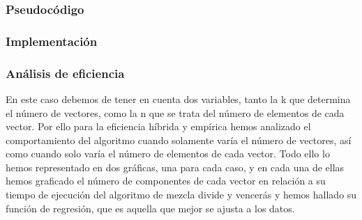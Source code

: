 \begin{figure}
\end{figure}

\subsubsection{Pseudocódigo}



\subsubsection{Implementación}



\subsubsection{Análisis de eficiencia}


En este caso debemos de tener en cuenta dos variables, tanto la k que determina el número de vectores, como la n que se trata del número de elementos de cada vector.
Por ello para la eficiencia híbrida y empírica hemos analizado el comportamiento del algoritmo cuando solamente varía el número de vectores, así como cuando solo varía el número de 
elementos de cada vector. 
Todo ello lo hemos representado en dos gráficas, una para cada caso, y en cada una de ellas hemos graficado el número de componentes de cada vector en relación a su tiempo de ejecución del algoritmo de mezcla
divide y vencerás y hemos hallado su función de regresión, que es aquella que mejor se ajusta a los datos.

